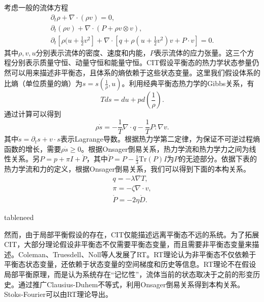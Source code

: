\documentclass{article}
\begin{document}
考虑一般的流体方程
\begin{subequations} \label{eq:fluid}
	\begin{align}
		\partial_t \rho + \nabla \cdot (\rho v) = 0 ,\\
		\partial_t (\rho v) + \nabla \cdot (P + \rho v \otimes v), \\
		\partial_t[\rho (u + \frac{1}{2} v^2] + \nabla \cdot [q + \rho (u+\frac{1}{2}v^2) v + P \cdot v] = 0.
	\end{align}
\end{subequations}
其中$\rho,v,u$分别表示流体的密度、速度和内能，$P$表示流体的应力张量。这三个方程分别表示质量守恒、动量守恒和能量守恒。CIT假设平衡态的热力学状态参量仍然可以用来描述非平衡态，且体系的熵依赖于这些状态变量。这里我们假设体系的比熵（单位质量的熵）为$s=s(\frac{1}{\rho},u)$。利用经典平衡态热力学的Gibbs关系，有
\begin{equation*}
	T ds = du + p d(\frac{1}{\rho}).
\end{equation*}
通过计算可以得到
\begin{equation*}
	\rho \dot{s} = - \frac{1}{T} \nabla \cdot q - \frac{1}{T} P: \nabla v.
\end{equation*}
其中$\dot{s} = \partial_t s + v \cdot s$表示Lagrange导数。根据热力学第二定律，为保证不可逆过程熵函数的增长，需要$\rho \dot{s} \ge 0 $。根据Onsager倒易关系，热力学流和热力学力之间为线性关系。另$P = p + \pi I + \mathring{P}$，其中$\mathring{P} = P - \frac{1}{3} \mbox{Tr}(P) I$为$P$的无迹部分。依据下表的热力学流和力的定义，根据Onsager倒易关系，我们可以得到下面的本构关系。
\begin{eqnarray*}
	q = -\lambda \nabla T, \\
	\pi =  - \zeta \nabla \cdot v, \\
	\mathring{P} = - 2 \eta \mathring{D}.
\end{eqnarray*}

tableneed

然而，由于局部平衡假设的存在，CIT仅能描述远离平衡态不远的系统。为了拓展CIT，大部分理论假设非平衡态不仅需要平衡态变量，而且需要非平衡态变量来描述。Coleman、Truesdell、Noll等人发展了RT。RT理论认为非平衡态不仅依赖于平衡态状态变量，还依赖于状态变量的空间梯度和历史等信息。RT理论不在假设局部平衡原理，而是认为系统存在“记忆性”，流体当前的状态取决于之前的形变历史。通过推广Clausius-Duhem不等式，利用Onsager倒易关系得到本构关系。Stoks-Fourier可以由RT理论导出\cite{}。
\end{document}
